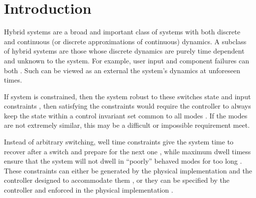 \section{Introduction}
Hybrid systems are a broad and important class of systems with both discrete and continuous (or discrete approximations of continuous) dynamics. A subclass of hybrid systems are those whose discrete dynamics are purely time dependent and unknown to the system. For example, user input and component failures can both . Such  can be viewed as an external  the system's dynamics at unforeseen times. 

If  system is constrained, then the system  robust to these switches  state and input constraints , then satisfying the constraints would require the controller to always keep the state within a control invariant set common to all modes \cite{Liberzon1999}. If the modes are not extremely similar, this may be a difficult or impossible requirement meet. 

Instead of arbitrary switching,  well time constraints give the system time to recover after a switch and prepare for the next one \cite{Danielson2019}, while maximum dwell times{s} ensure that the system will not dwell in ``poorly'' behaved modes for too long \cite{Hall2022}. These constraints can either be generated by the physical implementation and the controller designed to accommodate them \cite{Danielson2019}, or they can be specified by the controller and enforced in the physical implementation \cite{Zhang2016}. 

